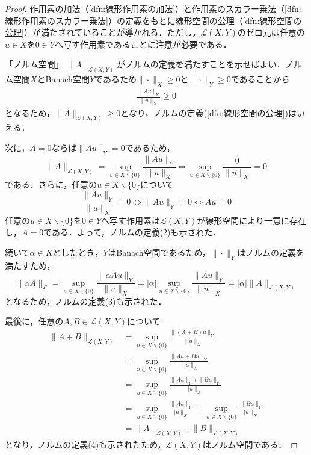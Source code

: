 \documentclass[11pt,a4paper,titlepage]{jsreport}
\theoremstyle{definition}
\begin{document}
\begin{proof}
  作用素の加法（\ref{dfn:線形作用素の加法}）と作用素のスカラー乗法（\ref{dfn:線形作用素のスカラー乗法}）の定義をもとに線形空間の公理（\ref{dfn:線形空間の公理}）が満たされていることが導かれる．ただし，$\mathcal{L}(X,Y)$のゼロ元は任意の$u\in X$を$0\in Y$へ写す作用素であることに注意が必要である．

  「ノルム空間」
  $\|A\|_{\mathcal{L}(X,Y)}$がノルムの定義を満たすことを示せばよい．ノルム空間$X$とBanach空間$Y$であるため$\|\cdot\|_X\geq 0$と$\|\cdot\|_Y\geq 0$であることから
  \begin{align*}
    \frac{\|Au\|_Y}{\|u\|_X} \geq 0
  \end{align*}
  となるため，$\|A\|_{\mathcal{L}(X,Y)}\geq 0$となり，ノルムの定義(\ref{dfn:線形空間の公理})はいえる．

  次に，$A=0$ならば$\|Au\|_Y=0$であるため，
  \begin{equation*}
    \|A\|_{\mathcal{L}(X,Y)}=\sup_{u\in X\backslash \{0\}} \frac{\|Au\|_Y}{\|u\|_X} = \sup_{u\in X\backslash \{0\}} \frac{0}{\|u\|_X} = 0
  \end{equation*}
  である．さらに，任意の$u\in X\backslash\{0\}$について
  \begin{equation*}
    \frac{\|Au\|_Y}{\|u\|_X} = 0 \Leftrightarrow \|Au\|_Y=0 \Leftrightarrow Au=0
  \end{equation*}
  任意の$u\in X\backslash \{0\}$を$0\in Y$へ写す作用素は$\mathcal{L}(X,Y)$が線形空間により一意に存在し，$A=0$である．よって，ノルムの定義(2)も示された．

  続いて$\alpha\in K$としたとき，$Y$はBanach空間であるため，$\|\cdot\|_Y$はノルムの定義を満たすため，
  \begin{equation*}
    \|\alpha A\|_{\mathcal{L}} = \sup_{u\in X\backslash \{0\}} \frac{\|\alpha Au\|_Y}{\|u\|_X} = |\alpha|\sup_{u\in X\backslash \{0\}} \frac{\| Au\|_Y}{\|u\|_X} = |\alpha|\|A\|_{\mathcal{L}(X,Y)}
  \end{equation*}
  となるため，ノルムの定義(3)も示された．

  最後に，任意の$A,B\in \mathcal{L}(X,Y)$について
  \begin{align*}
    \|A+B\|_{\mathcal{L}(X,Y)} & = \sup_{u\in X\backslash \{0\}} \frac{\|(A+B)u\|_Y}{\|u\|_X}                                                    \\
                               & = \sup_{u\in X\backslash \{0\}} \frac{\|Au+Bu\|_Y}{\|u\|_X}                                                     \\
                               & = \sup_{u\in X\backslash \{0\}} \frac{\|Au\|_Y + \|Bu\|_Y}{|u\|_X}                                              \\
                               & = \sup_{u\in X\backslash \{0\}} \frac{\|Au\|_Y}{|u\|_X} + \sup_{u\in X\backslash \{0\}} \frac{\|Bu\|_Y}{|u\|_X} \\
                               & = \|A\|_{\mathcal{L}(X,Y)} + \|B\|_{\mathcal{L}(X,Y)}
  \end{align*}
  となり，ノルムの定義(4)も示されたため，$\mathcal{L}(X,Y)$はノルム空間である．


\end{proof}
\end{document}
